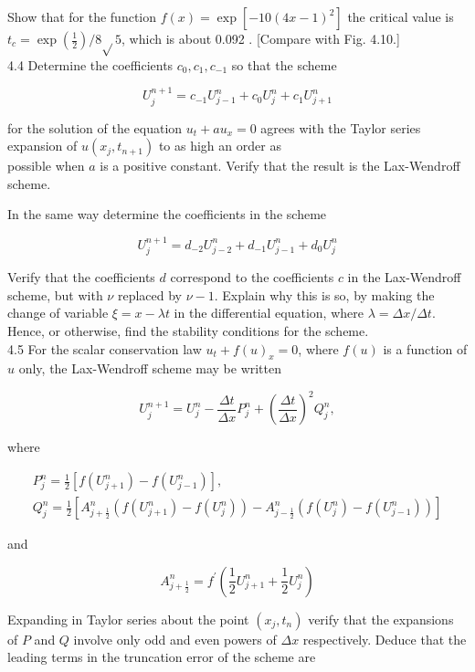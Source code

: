 \documentclass[10pt]{article}
\begin{document}
Show that for the function \(f(x)=\exp \left[-10(4 x-1)^{2}\right]\) the critical value is \(t_{c}=\exp \left(\frac{1}{2}\right) / 8 \sqrt{ } 5\), which is about 0.092 . [Compare with Fig. 4.10.]\\
4.4 Determine the coefficients \(c_{0}, c_{1}, c_{-1}\) so that the scheme

\[
U_{j}^{n+1}=c_{-1} U_{j-1}^{n}+c_{0} U_{j}^{n}+c_{1} U_{j+1}^{n}
\]

for the solution of the equation \(u_{t}+a u_{x}=0\) agrees with the Taylor series expansion of \(u\left(x_{j}, t_{n+1}\right)\) to as high an order as\\
possible when \(a\) is a positive constant. Verify that the result is the Lax-Wendroff scheme.

In the same way determine the coefficients in the scheme

\[
U_{j}^{n+1}=d_{-2} U_{j-2}^{n}+d_{-1} U_{j-1}^{n}+d_{0} U_{j}^{n}
\]

Verify that the coefficients \(d\) correspond to the coefficients \(c\) in the Lax-Wendroff scheme, but with \(\nu\) replaced by \(\nu-1\). Explain why this is so, by making the change of variable \(\xi=x-\lambda t\) in the differential equation, where \(\lambda=\Delta x / \Delta t\). Hence, or otherwise, find the stability conditions for the scheme.\\
4.5 For the scalar conservation law \(u_{t}+f(u)_{x}=0\), where \(f(u)\) is a function of \(u\) only, the Lax-Wendroff scheme may be written

\[
U_{j}^{n+1}=U_{j}^{n}-\frac{\Delta t}{\Delta x} P_{j}^{n}+\left(\frac{\Delta t}{\Delta x}\right)^{2} Q_{j}^{n},
\]

where

\[
\begin{gathered}
P_{j}^{n}=\frac{1}{2}\left[f\left(U_{j+1}^{n}\right)-f\left(U_{j-1}^{n}\right)\right], \\
Q_{j}^{n}=\frac{1}{2}\left[A_{j+\frac{1}{2}}^{n}\left(f\left(U_{j+1}^{n}\right)-f\left(U_{j}^{n}\right)\right)-A_{j-\frac{1}{2}}^{n}\left(f\left(U_{j}^{n}\right)-f\left(U_{j-1}^{n}\right)\right)\right]
\end{gathered}
\]

and

\[
A_{j+\frac{1}{2}}^{n}=f^{\prime}\left(\frac{1}{2} U_{j+1}^{n}+\frac{1}{2} U_{j}^{n}\right)
\]

Expanding in Taylor series about the point \(\left(x_{j}, t_{n}\right)\) verify that the expansions of \(P\) and \(Q\) involve only odd and even powers of \(\Delta x\) respectively. Deduce that the leading terms in the truncation error of the scheme are
\end{document}
